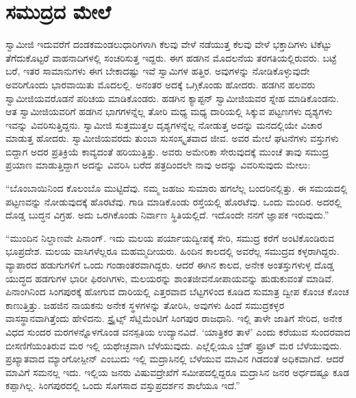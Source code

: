 
\chapter{ಸಮುದ್ರದ ಮೇಲೆ }

 ಸ್ವಾಮೀಜಿ ಇದುವರೆಗೆ ದಂಡಕಮಂಡಲುಧಾರಿಗಳಾಗಿ ಕೆಲವು ವೇಳೆ ನಡೆಯುತ್ತ ಕೆಲವು ವೇಳೆ ಭಕ್ತಾದಿಗಳು ಟಿಕೆಟ್ಟು ತೆಗೆದುಕೊಟ್ಟರೆ ವಾಹನಾದಿಗಳಲ್ಲಿ ಸಂಚರಿಸುತ್ತ ಇದ್ದರು. ಈಗ ಹಡಗಿನ ಮೊದಲನೆಯ ತರಗತಿಯಲ್ಲಿರುವರು. ಬಟ್ಟೆ ಬರೆ, ಇತರ ಸಾಮಾನುಗಳು ಈಗ ಬೇಕಾದಷ್ಟು ಇವೆ ಸ್ವಾಮಿಗಳ ಹತ್ತಿರ. ಅವುಗಳನ್ನು ನೋಡಿಕೊಳ್ಳುವುದೇ ಅವರಿಗೊಂದು ಭಾರವಾಯಿತು ಮೊದಲಲ್ಲಿ. ಅನಂತರ ಅದಕ್ಕೆ ಒಗ್ಗಿಕೊಂಡು ಹೋದರು. ಹಡಗಿನ ಹಲವರು ಸ್ವಾಮೀಜಿಯವರೊಡನೆ ಪರಿಚಯ ಮಾಡಿಕೊಂಡರು. ಹಡಗಿನ ಕ್ಯಾಪ್ಟನ್ ಸ್ವಾಮೀಜಿಯವರ ಸ್ನೇಹ ಮಾಡಿಕೊಂಡನು. ಆತ ಸ್ವಾಮೀಜಿಯವರಿಗೆ ಹಡಗಿನ ಭಾಗಗಳನ್ನೆಲ್ಲ ತೋರಿ ಮಧ್ಯ ಮಧ್ಯ ದಾರಿಯಲ್ಲಿ ಸಿಕ್ಕುವ ಪಟ್ಟಣಗಳು ದೃಶ್ಯಗಳು ಇವನ್ನು ವಿವರಿಸುತ್ತಿದ್ದನು. ಸ್ವಾಮೀಜಿ ಸುತ್ತಮುತ್ತಲ ದೃಶ್ಯಗಳನ್ನೆಲ್ಲ ನೋಡುತ್ತ ಅದನ್ನು ಮನದಲ್ಲಿಯೇ ವಿಚಾರ ಮಾಡುತ್ತ ಹೋದರು. ಸ್ವಾಮೀಜಿಯವರದು ತುಂಬಾ ಸುಸಂಸ್ಕೃತವಾದ ಜೀವ. ಅವರ ಮೇಲೆ ಘಟನೆಗಳು ವಸ್ತುಗಳು ಬಿದ್ದಾಗ ಅದರ ಪ್ರತಿಕ್ರಿಯೆ ಕಾವ್ಯದಂತೆ ಹರಿಯುತ್ತಿತ್ತು. ಅವರು ಅಮೇರಿಕಾ ಸೇರುವುದಕ್ಕೆ ಮುಂಚೆ ತಾವು ಸಮುದ್ರ ಪ್ರಯಾಣ ಮಾಡುತ್ತಿದ್ದಾಗ ಅದನ್ನು ವಿವರಿಸಿ ಬರೆದ ಪತ್ರದಿಂದಲೇ ನಾವು ಅದನ್ನು ವಿವರಿಸುವುದು ಮೇಲು: 

 “ಬೊಂಬಾಯಿನಿಂದ ಕೊಲಂಬೊ ಮುಟ್ಟಿದೆವು. ನಮ್ಮ ಜಹಜು ಸುಮಾರು ಹಗಲೆಲ್ಲ ಬಂದರಿನಲ್ಲಿತ್ತು. ಈ ಸಮಯದಲ್ಲಿ ಪಟ್ಟಣವನ್ನು ನೋಡುವುದಕ್ಕೆ ಹೊರಟೆವು. ಗಾಡಿ ಮಾಡಿಕೊಂಡು ರಸ್ತೆಯಲ್ಲಿ ಹೊರಟೆವು. ಒಂದು ಮಂದಿರ. ಅದರಲ್ಲಿ ದೊಡ್ಡ ಬುದ್ಧನ ವಿಗ್ರಹ. ಅದು ಒರಗಿಕೊಂಡು ನಿರ್ವಾಣ ಸ್ಥಿತಿಯಲ್ಲಿದೆ. ಇದೊಂದೇ ನನಗೆ ಜ್ಞಾಪಕ ಇರುವುದು.” 

 “ಮುಂದಿನ ನಿಲ್ದಾಣವೇ ಪಿನಾಂಗ್. ಇದು ಮಲಯ ಪರ್ಯಾಯದ್ವೀಪಕ್ಕೆ ಸೇರಿ, ಸಮುದ್ರ ಕರೆಗೆ ಅಂಟಿಕೊಂಡಿರುವ ಭೂಪ್ರದೇಶ. ಮಲಯ ವಾಸಿಗಳೆಲ್ಲರೂ ಮಹಮ್ಮದೀಯರು. ಹಿಂದಿನ ಕಾಲದಲ್ಲಿ ಅವರೆಲ್ಲ ಸಮುದ್ರದ ಕಳ್ಳರಾಗಿದ್ದರು. ವ್ಯಾಪಾರದ ಹಡುಗುಗಳಿಗೆ ಒಂದು ಗಂಡಾಂತರವಾಗಿದ್ದರು. ಆದರೆ ಈಗಿನ ಕಾಲದ, ಅನೇಕ ಅಂತಸ್ತುಗಳುಳ್ಳ ದೊಡ್ಡ ಯುದ್ಧದ ಹಡಗುಗಳ ಭಾರೀ ಫಿರಂಗಿಗಳು, ಮಲಯರನ್ನು ಶಾಂತಜೀವನೋಪಾಯವನ್ನು ಹುಡುಕುವಂತೆ ಮಾಡಿವೆ. ಪಿನಾಂಗಿನಿಂದ ಸಿಂಗಪುರಕ್ಕೆ ಹೋಗುವ ದಾರಿಯಲ್ಲಿ ಎತ್ತರವಾದ ಬೆಟ್ಟಗಳಿಂದ ಕೂಡಿದ ಸುಮಾತ್ರ ದ್ವೀಪ ಕೊಂಚ ಕೊಂಚ ಕಾಣುತ್ತಿತ್ತು. ಜಹಜಿನ ನಾಯಕನು ಅನೇಕ ಸ್ಥಳಗಳನ್ನು ತೋರಿಸಿ, ಅವುಗಳು ಹಿಂದೆ ಸಮುದ್ರಕಳ್ಳರ ವಾಸಸ್ಥಾನವಾಗಿತ್ತೆಂದು ಹೇಳಿದನು. ಸ್ಟ್ರೈಟ್ಸ್ ಸೆಟ್ಲಿಮೆಂಟಿಗೆ ಸಿಂಗಪುರ ರಾಜಧಾನಿ. ಇಲ್ಲಿ ತಾಳೇ ಜಾತಿಗೆ ಸೇರಿದ, ಅನೇಕ ವಿಧದ ಸುಂದರ ಮರಗಳನ್ನೊಳಗೊಂಡ ವನಸ್ಪತಿಯ ಉದ್ಯಾನವಿದೆ. ‘ಯಾತ್ರಿಕರ ತಾಳೆ’ ಎಂದು ಕರೆಯುವ ಸುಂದರವಾದ ಬೀಸಣಿಗೆಯಂತಿರುವ ಮರ ಇಲ್ಲಿ ಯಥೇಚ್ಛವಾಗಿ ಬೆಳೆಯುವುದು. ಎಲ್ಲೆಲ್ಲಿಯೂ ಬ್ರೆಡ್ ಫ್ರೂಟ್ ಮರ ಬೆಳೆಯುವುದು. ಪ್ರಖ್ಯಾತವಾದ ಮ್ಯಾಂಗೋಸ್ಪೀನ್ ಎಂಬುದು ಇಲ್ಲಿ ಮದ್ರಾಸಿನಲ್ಲಿ ಬೆಳೆಯುವ ಮಾವಿನ ಗಿಡದಂತೆ ಅಧಿಕವಾಗಿದೆ. ಆದರೆ ಮಾವಿಗೆ ಸಮನಲ್ಲ ಇದು. ಇಲ್ಲಿಯ ಜನರು ವಿಷುವದ್ರೇಖೆಗೆ ಸಮೀಪದಲ್ಲಿದ್ದರೂ ಮದ್ರಾಸಿನ ಜನರ ಅರ್ಧದಷ್ಟೂ ಕೂಡ ಕಪ್ಪಾಗಿಲ್ಲ. ಸಿಂಗಪುರದಲ್ಲಿ ಒಂದು ಸೊಗಸಾದ ವಸ್ತುಪ್ರದರ್ಶನ ಶಾಲೆಯೂ ಇದೆ.” 

